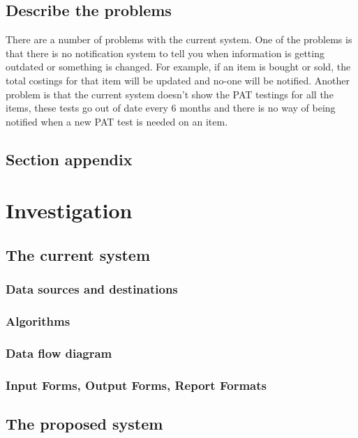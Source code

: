 \subsection{Describe the problems}

There are a number of problems with the current system. One of the problems is that there is no notification system to tell you when information is getting outdated or something is changed. For example, if an item is bought or sold, the total costings for that item will be updated and no-one will be notified. Another problem is that the current system doesn't show the PAT testings for all the items, these tests go out of date every 6 months and there is no way of being notified when a new PAT test is needed on an item.

\subsection{Section appendix}



\section{Investigation}

\subsection{The current system}

\subsubsection{Data sources and destinations}

\subsubsection{Algorithms}

\subsubsection{Data flow diagram}

\subsubsection{Input Forms, Output Forms, Report Formats}

\subsection{The proposed system}

